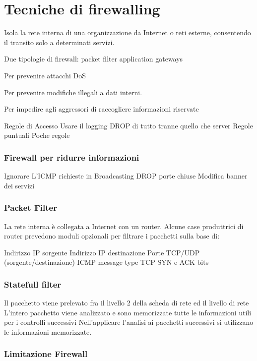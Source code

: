 \chapter{Tecniche di firewalling}  %

Isola la rete interna di una organizzazione da Internet o reti esterne, consentendo il transito solo a determinati servizi.

Due tipologie di firewall:
packet filter
application gateways

Per prevenire attacchi DoS

Per prevenire modifiche illegali a dati
interni.

Per impedire agli aggressori di
raccogliere informazioni riservate


Regole di Accesso
Usare il logging
DROP di tutto tranne quello che server
Regole puntuali
Poche regole 
\subsection{ Firewall per ridurre informazioni}
Ignorare
L'ICMP
richieste in Broadcasting
DROP porte chiuse
Modifica banner dei servizi

\subsection{Packet Filter}

La rete interna è collegata a Internet con un router.
Alcune case produttrici di router prevedono moduli opzionali per filtrare i pacchetti sulla base di:

Indirizzo IP sorgente
Indirizzo IP destinazione
Porte TCP/UDP (sorgente/destinazione)
ICMP message type
TCP SYN e ACK bits

\subsection{ Statefull filter}

Il pacchetto viene prelevato fra il livello 2 della scheda di rete ed il livello di rete
L’intero pacchetto viene analizzato e sono memorizzate tutte le informazioni utili per i controlli successivi
Nell’applicare l’analisi ai pacchetti successivi si utilizzano le informazioni memorizzate.
 
 
 \subsection{Limitazione Firewall}
 
